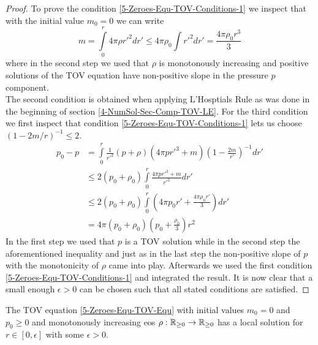 \begin{proof}
	To prove the condition \eqref{5-Zeroes-Equ-TOV-Conditions-1} we inspect that with the initial value $m_0=0$ we can write
	\begin{equation}
		m = \int\limits_0^r 4\pi\rho r'^2dr'\leq4\pi\rho_0\int\limits r'^2dr'=\frac{4\pi\rho_0r^3}{3}
	\end{equation}
	where in the second step we used that $\rho$ is monotonously increasing and positive solutions of the \ac{TOV} equation have non-positive slope in the pressure $p$ component.\\
	The second condition is obtained when applying L'Hosptials Rule as was done in the beginning of section \ref{4-NumSol-Sec-Comp-TOV-LE}.
	For the third condition we first inspect that condition \ref{5-Zeroes-Equ-TOV-Conditions-1} lets us choose $(1-2m/r)^{-1}\leq 2$.
	\begin{align}
		p_0 - p &=\int\limits_0^r\frac{1}{r'^2}\left(p+\rho\right)\left(4\pi pr'^3+m\right)\left(1-\frac{2m}{r'}\right)^{-1}dr'\\
				&\leq2\left(p_0+\rho_0\right)\int\limits_0^r\frac{4\pi pr'^3+m}{r'^2}dr'\\
				&\leq2(p_0+\rho_0)\int\limits_0^r\left(4\pi p_0r' + \frac{4\pi\rho_0r'}{3}\right)dr'\\
				&=4\pi(p_0+\rho_0)\left(p_0+\frac{\rho_0}{3}\right)r^2
	\end{align}
	In the first step we used that $p$ is a \ac{TOV} solution while in the second step the aforementioned inequality and just as in the last step the non-positive slope of $p$ with the monotonicity of $\rho$ came into play.
	Afterwards we used the first condition \ref{5-Zeroes-Equ-TOV-Conditions-1} and integrated the result.
	It is now clear that a small enough $\epsilon>0$ can be chosen such that all stated conditions are satisfied.
\end{proof}
\begin{lemma}
	The \ac{TOV} equation \ref{5-Zeroes-Equ-TOV-Equ} with initial values $m_0=0$ and $p_0\geq0$ and monotonously increasing \ac{eos} $\rho:\mathbb{R}_{\geq0}\rightarrow\mathbb{R}_{\geq0}$ has a local solution for $r\in[0,\epsilon]$ with some $\epsilon>0$.
\end{lemma}
